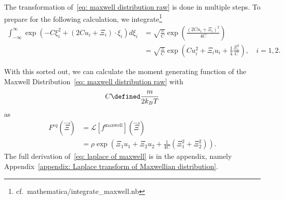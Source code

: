 The transformation of~\eqref{eq: maxwell distribution raw} is done in multiple steps.
To prepare for the following calculation, we integrate\footnote{cf.\ mathematica/integrate\_maxwell.nb}
\begin{equation}
  \label{eq:integrate exponential sage}
  \begin{aligned}
    \int_{-\infty}^{\infty} \exp \left(-C \xi_i^2 + (2Cu_i + \Xi_i)\cdot\xi_i \right) d\xi_i
    & = \sqrt{\frac{\pi}{C}}\exp \left( \frac{{(2Cu_i + \Xi_i)}^2}{4C}\right)
    \\
    & = \sqrt{\frac{\pi}{C}}\exp \left(Cu_i^2 + \Xi_i u_i + \frac{1}{4} \frac{\Xi_i^2}{C}\right),\quad i=1,2
    .
  \end{aligned}
\end{equation}

With this sorted out, we can calculate the moment generating function of the Maxwell Distribution~\eqref{eq: maxwell distribution raw} with
\begin{equation}
  C \defined \frac{m}{2 k_B T}
\end{equation}
as
\begin{equation}
  \label{eq: laplace of maxwell}
  \begin{aligned}
    F^{eq}(\vec{\Xi}) & = \mathcal{L}[f^{\text{maxwell}}](\vec{\Xi})
    \\& = \rho
      \exp \left( \Xi_1 u_1 + \Xi_2 u_2 + \frac{1}{4C}\left(\Xi_1^2 + \Xi_2^2 \right)\right).
  \end{aligned}
\end{equation}
The full derivation of~\eqref{eq: laplace of maxwell} is in the appendix, namely Appendix~\ref{appendix: Laplace transform of Maxwellian distribution}.
